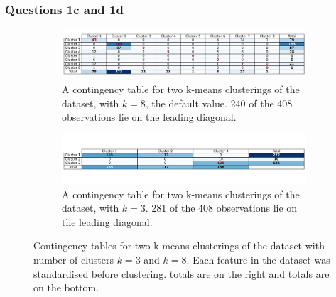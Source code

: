 \subsubsection{Questions 1c and 1d}\label{subsubsec:q1c}
    \begin{figure}[htb]
    \centering
    \begin{subfigure}[b]{0.9\linewidth}
        \includegraphics[width=1\textwidth]{./figures/q1c}
        \caption{A contingency table for two k-means clusterings of the  dataset, with $k=8$,
            the default  value. 240 of the 408 observations lie on the leading diagonal.}
        \label{fig:q1c}
    \end{subfigure}
    \hfill
    \begin{subfigure}[b]{0.9\linewidth}
        \includegraphics[width=1\textwidth]{./figures/q1d}
        \caption{A contingency table for two k-means clusterings of the  dataset, with $k=3$.
            281 of the 408 observations lie on the leading diagonal.}
        \label{fig:q1d}
    \end{subfigure}
    \caption{Contingency tables for two k-means clusterings of the  dataset with number of
        clusters $k=3$ and $k=8$.
        Each feature in the dataset was standardised before clustering.
         totals are on the right and  totals are on the bottom.}
    \label{fig:q1cb}
    \end{figure}

